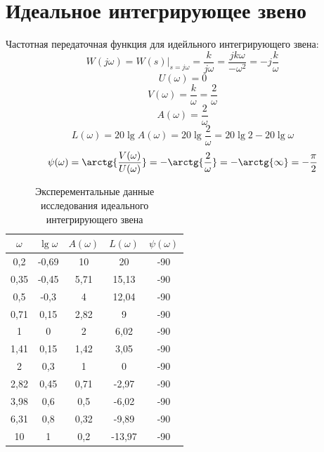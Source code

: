 \documentclass[a4paper, 11pt, russian]{article}
\begin{document}
    \section{Идеальное интегрирующее звено}
    Частотная передаточная функция для идейльного интегрирующего звена:
    $$W(j\omega) = W(s)\big|_{s = j\omega} = \frac{k}{j\omega} = \frac{jk\omega}{-\omega^2} = -j\frac{k}{\omega}$$
    $$U(\omega) = 0$$
    $$V(\omega) = \frac{k}{\omega} = \frac{2}{\omega}$$
    $$A(\omega) = \frac{2}{\omega}$$
    $$L(\omega) = 20\lg{A(\omega)} = 20\lg{\frac{2}{\omega}} = 20\lg{2} - 20\lg{\omega}$$
    $$\psi(\omega) = \arctg{\frac{V(\omega)}{U(\omega)}} = -\arctg{\frac{2}{\omega}} = -\arctg{\infty} = -\frac{\pi}{2}$$
    \begin{table}[ht!]
        \flushleft
        \caption{Эксперементальные данные исследования идеального интегрирующего звена}
        \begin{tabular}{c|c|c|c|c}
            $\omega$ & $\lg{\omega}$ & $A(\omega)$ & $L(\omega)$ & $\psi(\omega)$\\
            \hline
            0,2 & -0,69 & 10 & 20 & -90\\
            \hline
            0,35 & -0,45 & 5,71 & 15,13 & -90\\
            \hline
            0,5 & -0,3 & 4 & 12,04 & -90\\
            \hline
            0,71 & 0,15 & 2,82 & 9 & -90\\
            \hline
            1 & 0 & 2 & 6,02 & -90\\
            \hline
            1,41 & 0,15 & 1,42 & 3,05 & -90\\
            \hline
            2 & 0,3 & 1 & 0 & -90\\ 
            \hline
            2,82 & 0,45 & 0,71 & -2,97 & -90\\
            \hline
            3,98 & 0,6 & 0,5 & -6,02 & -90\\
            \hline
            6,31 & 0,8 & 0,32 & -9,89 & -90\\
            \hline
            10 & 1 & 0,2 & -13,97 & -90
        \end{tabular}
    \end{table}
\end{document}
